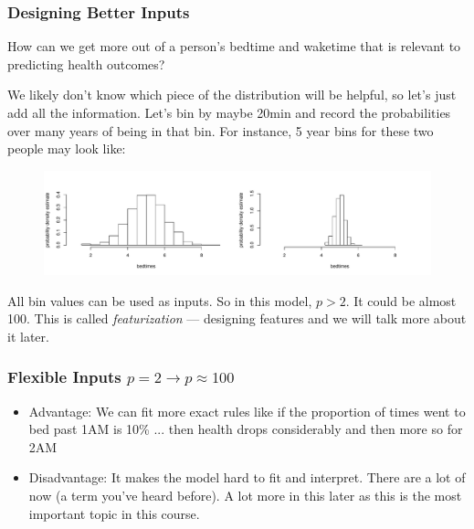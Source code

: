 \documentclass[handout]{beamer}
\begin{document}
\begin{frame}\frametitle{Designing Better Inputs}

\small
How can we get more  out of a person's bedtime and waketime that is relevant to predicting health outcomes? \pause 

We likely don't know which piece of the distribution will be helpful, so let's just add all the information. Let's bin by maybe 20min and record the probabilities over many years of being in that bin. For instance, 5 year bins for these two people may look like:

%	
\vspace{-0.2cm}
\begin{figure}
\centering
\includegraphics[width=4.5in]{two_hists}
\end{figure}

All bin values can be used as inputs. So in this model, $p > 2$. It could be almost 100. This is called \emph{featurization} --- designing features and we will talk more about it later.

\end{frame}

\begin{frame}\frametitle{Flexible Inputs $p=2 \rightarrow p \approx 100$}

\begin{itemize}
\item Advantage: We can fit more exact rules like if the proportion of times went to bed past 1AM is 10\% ... then health drops considerably and then more so for 2AM \pause 
\item Disadvantage: It makes the model hard to fit and interpret. There are a lot of  now (a term you've heard before). A lot more in this later as this is the most important topic in this course.
\end{itemize}

\end{frame}
\end{document}
